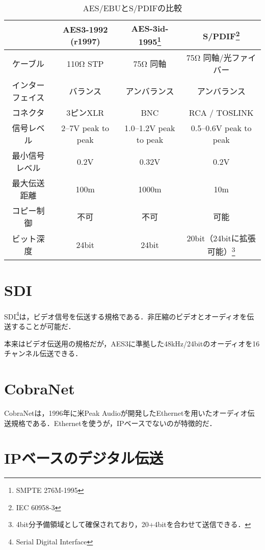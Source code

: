 \begin{table}[htb]
  \begin{minipage}{\textwidth}
    \label{tab:compare}
    \caption{AES/EBUとS/PDIFの比較\cite{aesebuandspdif}}
    \begin{tabular}{c|ccc} \hline
      & AES3-1992 (r1997) & AES-3id-1995\footnote{SMPTE 276M-1995} & S/PDIF\footnote{IEC 60958-3} \\ \hline \hline
      ケーブル & 110Ω STP & 75Ω 同軸 & 75Ω 同軸/光ファイバー \\
      インターフェイス & バランス & アンバランス & アンバランス \\
      コネクタ & 3ピンXLR & BNC & RCA / TOSLINK \\
      信号レベル & 2--7V peak to peak & 1.0--1.2V peak to peak & 0.5--0.6V peak to peak \\
      最小信号レベル & 0.2V & 0.32V & 0.2V \\
      最大伝送距離 & 100m & 1000m & 10m \\
      コピー制御 & 不可 & 不可 & 可能 \\
      ビット深度 & 24bit & 24bit & 20bit（24bitに拡張可能）\footnote{4bit分予備領域として確保されており，20+4bitを合わせて送信できる．} \\
    \end{tabular}
  \end{minipage}
\end{table}

\section{SDI}

SDI\footnote{Serial Digital Interface}は，ビデオ信号を伝送する規格である．非圧縮のビデオとオーディオを伝送することが可能だ．

本来はビデオ伝送用の規格だが，AES3に準拠した48kHz/24bitのオーディオを16チャンネル伝送できる．

\section{CobraNet}

CobraNetは，1996年に米Peak Audioが開発したEthernetを用いたオーディオ伝送規格である．Ethernetを使うが，IPベースでないのが特徴的だ\cite{best-practices-in-network-audio}．

\section*{IPベースのデジタル伝送}

